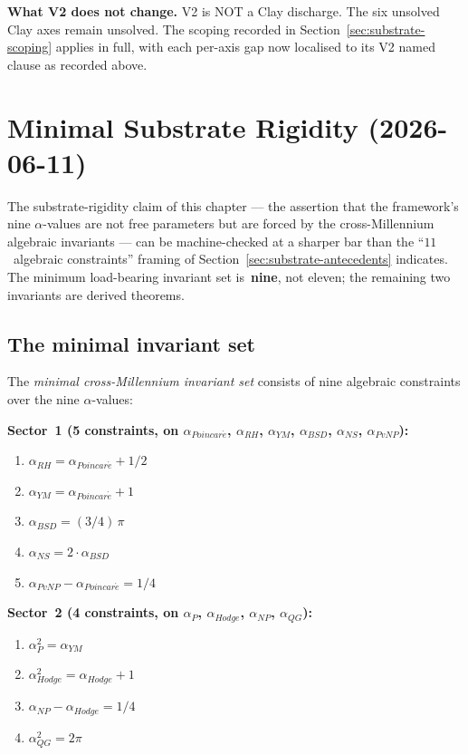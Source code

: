 \noindent\textbf{What V2 does not change.}
V2 is NOT a Clay discharge. The six unsolved Clay axes remain
unsolved. The scoping recorded in
Section~\ref{sec:substrate-scoping} applies in full, with each
per-axis gap now localised to its V2 named clause as recorded above.

\section{Minimal Substrate Rigidity (2026-06-11)}
\label{sec:minimal-substrate-rigidity}

The substrate-rigidity claim of this chapter --- the assertion that
the framework's nine $\alpha$-values are not free parameters but
are forced by the cross-Millennium algebraic invariants --- can be
machine-checked at a sharper bar than the
``$11$~algebraic constraints'' framing of
Section~\ref{sec:substrate-antecedents} indicates. The minimum
load-bearing invariant set is~\textbf{nine}, not eleven; the
remaining two invariants are derived theorems.

\subsection{The minimal invariant set}
\label{subsec:minimal-invariants}

\begin{definition}
\label{def:minimal-cm-invariants}
The \emph{minimal cross-Millennium invariant set} consists of nine
algebraic constraints over the nine $\alpha$-values:

\smallskip

\noindent\textbf{Sector~1 (5 constraints, on $\alpha_{Poincar\acute{e}}$,
$\alpha_{RH}$, $\alpha_{YM}$, $\alpha_{BSD}$, $\alpha_{NS}$, $\alpha_{PvNP}$):}
\begin{enumerate}[label=(M\arabic*)]
\item $\alpha_{RH} = \alpha_{Poincar\acute{e}} + 1/2$
\item $\alpha_{YM} = \alpha_{Poincar\acute{e}} + 1$
\item $\alpha_{BSD} = (3/4)\,\pi$
\item $\alpha_{NS} = 2 \cdot \alpha_{BSD}$
\item $\alpha_{PvNP} - \alpha_{Poincar\acute{e}} = 1/4$
\end{enumerate}

\noindent\textbf{Sector~2 (4 constraints, on $\alpha_{P}$, $\alpha_{Hodge}$,
$\alpha_{NP}$, $\alpha_{QG}$):}
\begin{enumerate}[label=(M\arabic*),resume]
\item $\alpha_{P}^{2} = \alpha_{YM}$
\item $\alpha_{Hodge}^{2} = \alpha_{Hodge} + 1$
\item $\alpha_{NP} - \alpha_{Hodge} = 1/4$
\item $\alpha_{QG}^{2} = 2\pi$
\end{enumerate}
\end{definition}


